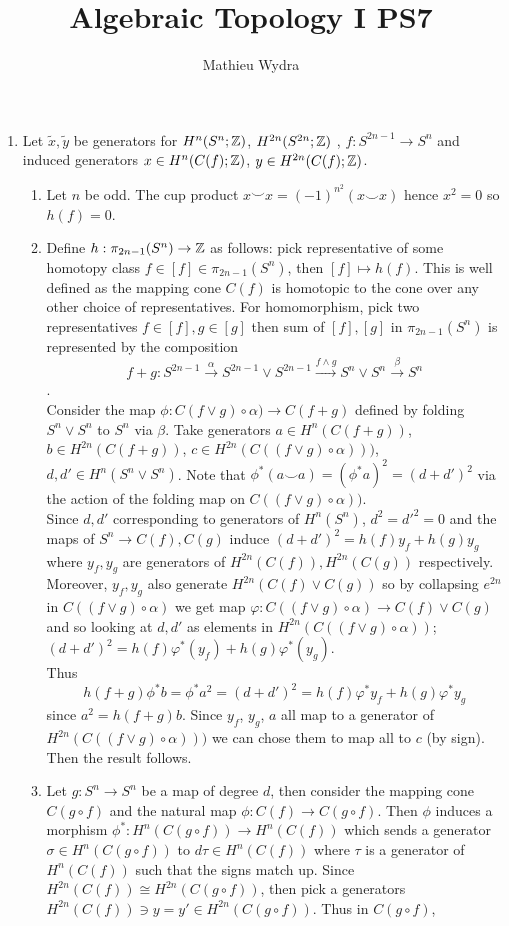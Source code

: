 \documentclass[10pt,a4paper]{article}
\title{Algebraic Topology I PS7}
\author{Mathieu Wydra}
\begin{document}
\maketitle
\begin{enumerate}
\item Let $\tilde{x}, \tilde{y}$ be generators for $H^n(S^n;\mathbb{Z})$, $H^{2n}(S^{2n};\mathbb{Z})$ , $f:S^{2n-1}\to S^n$ and induced generators $x\in H^n(C(f);\mathbb{Z})$, $y\in H^{2n}(C(f);\mathbb{Z})$.
\begin{enumerate}
\item Let $n$ be odd. The cup product $x\smile x = (-1)^{n^2}(x\smile x)$ hence $x^2 = 0$ so $h(f) = 0$.
\item Define $h:\pi_{2n-1}(S^n)\to \mathbb{Z}$ as follows: pick representative of some homotopy class $f\in [f]\in \pi_{2n-1}(S^n)$, then $[f]\mapsto h(f)$. This is well defined as the mapping cone $C(f)$ is homotopic to the cone over any other choice of representatives.
For homomorphism, pick two representatives $f\in [f], g\in [g]$ then sum of $[f],[g]$ in $\pi_{2n-1}(S^n)$ is represented by the composition 
\[f+g:S^{2n-1}\xrightarrow{\alpha} S^{2n-1}\vee S^{2n-1}\xrightarrow{f\wedge	g}S^n \vee S^n\xrightarrow{\beta} S^n\]. \\
Consider the map $\phi:C(f\vee g)\circ \alpha)\to 
C(f+g)$ defined by folding $S^n\vee S^n$ to $S^n$ via $\beta$. Take generators $a\in H^n(C(f+g))$, $b\in H^{2n}(C(f+g))$, $c\in H^{2n}(C((f\vee g)\circ \alpha)))$, $d,d'\in H^{n}(S^n\vee S^n)$. Note that $\phi^*(a\smile a) = (\phi^* a)^2 = (d+d')^2$ via the action of the folding map on $C((f\vee g)\circ \alpha))$.\\
 Since $d, d'$ corresponding to generators of $H^n(S^n)$, $d^2 = d'^2 = 0$ and the maps of $S^n\to C(f), C(g)$ induce $(d+d')^2 = h(f)y_f + h(g)y_g$ where $y_f,y_g$ are generators of $H^{2n}(C(f)), H^{2n}(C(g))$ respectively. Moreover, $y_f, y_g$ also generate $H^{2n}(C(f)\vee C(g))$ so by collapsing $e^{2n}$ in $C((f \vee g)\circ \alpha)$ we get map $\varphi: C((f \vee g)\circ \alpha)\to C(f)\vee C(g)$ and so looking at $d,d'$ as elements in $H^{2n}(C((f \vee g)\circ \alpha))$; $(d+d')^2 = h(f)\varphi^*(y_f) + h(g)\varphi^*(y_g)$. \\
Thus
\[h(f+g)\phi^*b = \phi^* a^2 = (d+d')^2 = h(f)\varphi^* y_f + h(g)\varphi^* y_g\]
since $a^2 = h(f+g)b$. Since $y_f$, $y_g$, $a$ all map to a generator of $H^{2n}(C((f\vee g)\circ \alpha)))$ we can chose them to map all to $c$ (by sign). Then the result follows.
\item Let $g:S^n \to S^n$ be a map of degree $d$, then consider the mapping cone $C(g\circ f)$ and the natural map $\phi:C(f)\to C(g\circ f)$. Then $\phi$ induces a morphism $\phi^*:H^n(C(g\circ f))\to H^n(C(f))$ which sends a generator $\sigma\in H^n(C(g\circ f))$ to $d\tau\in H^n(C(f))$ where $\tau$ is a generator of $H^n(C(f))$ such that the signs match up. Since $H^{2n}(C(f)) \cong H^{2n}(C(g\circ f))$, then pick a generators $H^{2n}(C(f))\ni y = y' \in H^{2n}(C(g\circ f))$. Thus in $C(g\circ f)$, 

\end{enumerate}
\end{enumerate}
\end{document}
